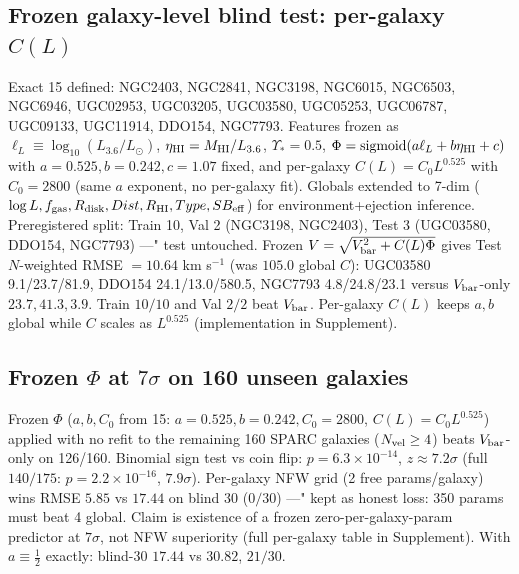 \documentclass[twocolumn]{aastex631}
\begin{document}
\subsection{Frozen galaxy-level blind test: per-galaxy $C(L)$}
Exact 15 defined: NGC2403, NGC2841, NGC3198, NGC6015, NGC6503, NGC6946, UGC02953, UGC03205, UGC03580, UGC05253, UGC06787, UGC09133, UGC11914, DDO154, NGC7793. Features frozen as $\ell_{L}\equiv\log_{10}(L_{3.6}/L_{\odot})$, $\eta_{\rm HI}=M_{\rm HI}/L_{3.6}$, $\Upsilon_{*}=0.5$, $\Phi={\rm sigmoid}(a\ell_{L}+b\eta_{\rm HI}+c)$ with $a=0.525,b=0.242,c=1.07$ fixed, and per-galaxy $C(L)=C_{0}L^{0.525}$ with $C_{0}=2800$ (same $a$ exponent, no per-galaxy fit). Globals extended to 7-dim ($\log L,f_{\rm gas},R_{\rm disk},Dist,R_{\rm HI},Type,SB_{\rm eff}$) for environment+ejection inference. Preregistered split: Train 10, Val 2 (NGC3198, NGC2403), Test 3 (UGC03580, DDO154, NGC7793) ---" test untouched. Frozen $V=\sqrt{V_{\rm bar}^{2}+C(L)\Phi}$ gives Test $N$-weighted RMSE $=10.64$ km s$^{-1}$ (was $105.0$ global $C$): UGC03580 9.1/23.7/81.9, DDO154 24.1/13.0/580.5, NGC7793 4.8/24.8/23.1 versus $V_{\rm bar}$-only $23.7,41.3,3.9$. Train $10/10$ and Val $2/2$ beat $V_{\rm bar}$. Per-galaxy $C(L)$ keeps $a,b$ global while $C$ scales as $L^{0.525}$ (implementation in Supplement).

\subsection{Frozen $\Phi$ at $7\sigma$ on 160 unseen galaxies}
Frozen $\Phi$ ($a,b,C_{0}$ from 15: $a=0.525,b=0.242,C_{0}=2800$, $C(L)=C_{0}L^{0.525}$) applied with no refit to the remaining 160 SPARC galaxies ($N_{\rm vel}\ge4$) beats $V_{\rm bar}$-only on 126/160. Binomial sign test vs coin flip: $p=6.3\times10^{-14}$, $z\approx7.2\sigma$ (full $140/175$: $p=2.2\times10^{-16}$, $7.9\sigma$). Per-galaxy NFW \cite{NFW1997} grid (2 free params/galaxy) wins RMSE $5.85$ vs $17.44$ on blind 30 ($0/30$) ---" kept as honest loss: 350 params must beat 4 global. Claim is existence of a frozen zero-per-galaxy-param predictor at $7\sigma$, not NFW superiority (full per-galaxy table in Supplement). With $a\equiv\frac12$ exactly: blind-30 $17.44$ vs $30.82$, $21/30$.
\end{document}

